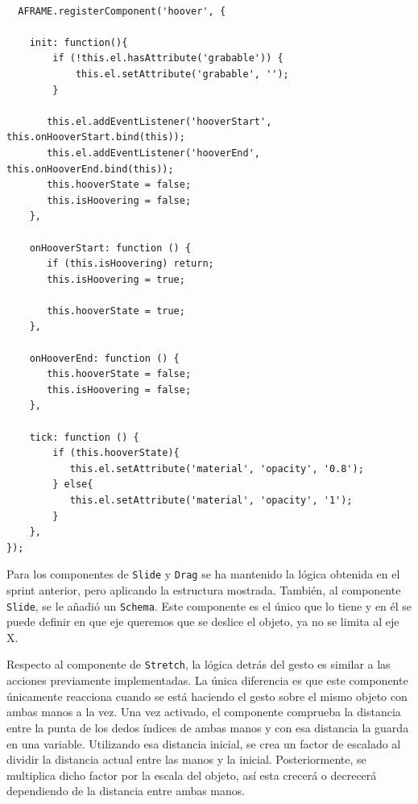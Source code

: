\documentclass[a4paper, 12pt]{book}
\begin{document}
\begin{lstlisting}[caption=Componente Hoover, captionpos=b, label=lst:Hoover]
  
  AFRAME.registerComponent('hoover', {

    init: function(){
        if (!this.el.hasAttribute('grabable')) {
            this.el.setAttribute('grabable', '');
        }

       this.el.addEventListener('hooverStart', this.onHooverStart.bind(this));
       this.el.addEventListener('hooverEnd', this.onHooverEnd.bind(this));
       this.hooverState = false;
       this.isHoovering = false;
    },

    onHooverStart: function () {
       if (this.isHoovering) return;
       this.isHoovering = true;

       this.hooverState = true;
    },

    onHooverEnd: function () {
       this.hooverState = false;
       this.isHoovering = false;
    },

    tick: function () {
        if (this.hooverState){
           this.el.setAttribute('material', 'opacity', '0.8');
        } else{
           this.el.setAttribute('material', 'opacity', '1');
        }
    },
});
\end{lstlisting}

Para los componentes de \texttt{Slide} y \texttt{Drag} se ha mantenido la lógica obtenida en el sprint anterior, pero aplicando la estructura mostrada. 
También, al componente \texttt{Slide}, se le añadió un \texttt{Schema}. Este componente es el único que lo tiene y en él se puede definir en que eje queremos que se deslice el objeto, ya no se limita al eje X.

Respecto al componente de \texttt{Stretch}, la lógica detrás del gesto es similar a las acciones previamente implementadas. La única diferencia es que este componente únicamente reacciona cuando se está haciendo el gesto sobre el mismo objeto con ambas manos a la vez.
Una vez activado, el componente comprueba la distancia entre la punta de los dedos índices de ambas manos y con esa distancia la guarda en una variable. Utilizando esa distancia inicial, se crea un factor de escalado al dividir la distancia actual entre las manos y la inicial. Posteriormente, se multiplica dicho factor por la escala del objeto, así esta crecerá o decrecerá dependiendo de la distancia entre ambas manos. 
\end{document}

